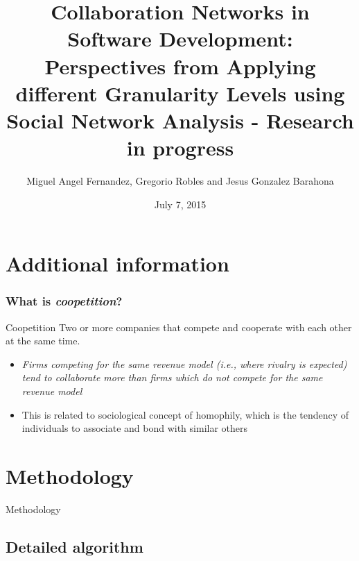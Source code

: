 \documentclass{beamer}
\title[SATToSE 2015]{Collaboration Networks in Software Development: Perspectives from Applying different Granularity Levels using Social Network Analysis - Research in progress} %
\author{Miguel Angel Fernandez, Gregorio Robles and Jesus Gonzalez Barahona} %
\institute[UCLA] %
{
GSyC/LibreSoft, Rey Juan Carlos University \\ %
\medskip
\textit{(ma.fernandezsa@alumnos, grex@)urjc.es; jgb@bitergia.com} %
}
\date{July 7, 2015} %
\begin{document}
\begin{frame}
\titlepage %
\end{frame}


\section{Additional information} %

\begin{frame}
\frametitle{What is \textit{coopetition}?}
\begin{block}{Coopetition}
Two or more companies that compete and cooperate with each other at the same time.
\end{block}
\begin{itemize}
\item \textit{Firms competing for the same revenue model (i.e., where rivalry is
expected) tend to collaborate more than firms which do not compete for the same
revenue model}
\item This is related to sociological concept of homophily, which is the tendency of individuals to associate and bond with similar others
\end{itemize}

\end{frame}

\section{Methodology}
\begin{frame}
\Huge{\centerline{Methodology}}
\end{frame}

\subsection{Detailed algorithm}
\end{document}

